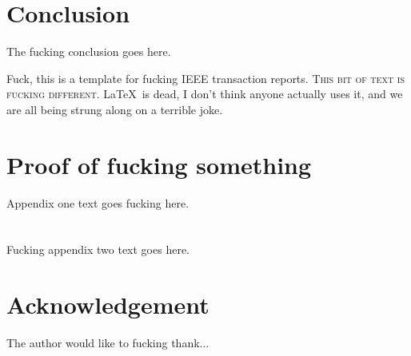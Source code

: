 \documentclass[journal,transmag]{IEEEtran}
\begin{document}
	\section{Conclusion}
	The fucking conclusion goes here.
	
		{F}{uck}, this is a template for fucking IEEE transaction reports. \textsc{This bit of text is fucking different.} \LaTeX\ is dead, I don't think anyone actually uses it, and we are all being strung along on a terrible joke.
	
	\newpage
	
	\appendices
	\section{Proof of fucking something}
	Appendix one text goes fucking here.
	
	
	\section{}
	Fucking appendix two text goes here.
	
	\section*{Acknowledgement}
	The author would like to fucking thank...
	
	
	
	
\end{document}
